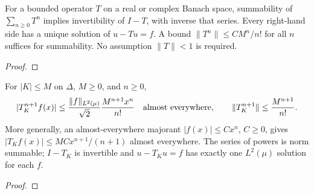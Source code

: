 \begin{supporting}
\begin{theorem}
\label{thm:factorial-operator-resolvent}
\leanok
For a bounded operator $T$ on a real or complex Banach space, summability of
$\sum_{n\ge0}T^n$ implies invertibility of $I-T$, with inverse that series.
Every right-hand side has a unique solution of $u-Tu=f$.
A bound $\|T^n\|\le C M^n/n!$ for all $n$ suffices for summability.
No assumption $\|T\|<1$ is required.
\end{theorem}
\begin{proof}
\leanok
\end{proof}
\end{supporting}


\begin{theorem}
\label{thm:volterra-factorial-inverse}
\leanok
For $|K|\le M$ on $\Delta$, $M\ge0$, and $n\ge0$,
\[
 |T_K^{n+1}f(x)|\le \frac{\|f\|_{L^2(\mu)}}{\sqrt2}
                  \frac{M^{n+1}x^n}{n!}\quad\hbox{almost everywhere},
 \qquad \|T_K^{n+1}\|\le\frac{M^{n+1}}{n!}.
\]
More generally, an almost-everywhere majorant $|f(x)|\le Cx^n$, $C\ge0$,
gives $|T_Kf(x)|\le MCx^{n+1}/(n+1)$ almost everywhere.
The series of powers is norm summable; $I-T_K$ is invertible and
$u-T_Ku=f$ has exactly one $L^2(\mu)$ solution for each $f$.
\end{theorem}
\begin{proof}
\leanok
\end{proof}

